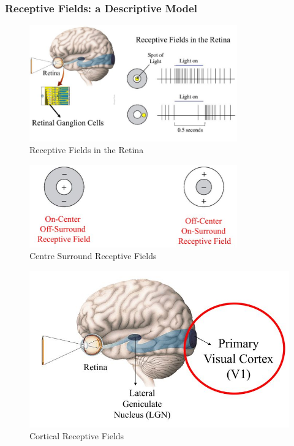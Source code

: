 \documentclass[]{article}
\begin{document}
\subsubsection{Receptive Fields: a Descriptive Model}

\begin{figure}[H]
	\caption{Receptive Fields in the Retina}
	\includegraphics[width=0.8\textwidth]{receptive-fields-in-the-retina}
\end{figure}

\begin{figure}[H]
	\caption{Centre Surround Receptive Fields}
	\includegraphics[width=0.8\textwidth]{center-surround}
\end{figure}

\begin{figure}[H]
	\caption{Cortical Receptive Fields}
	\includegraphics[width=\textwidth]{CorticalReceptive Fields}
\end{figure}
\end{document}
